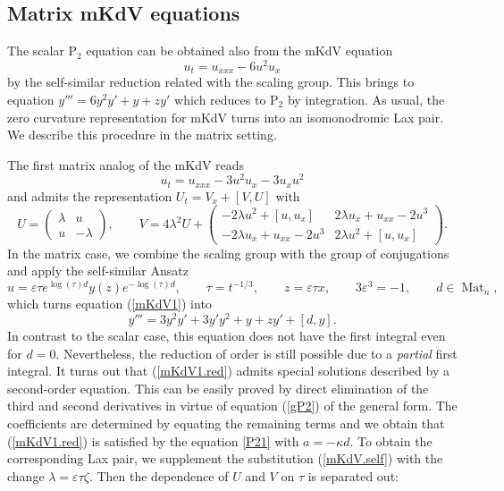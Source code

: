 \documentclass{article}
\theoremstyle{plain}
\theoremstyle{definition}
\DeclareMathOperator{\Mat}{Mat}
\begin{document}
\subsection{Matrix mKdV equations}

The scalar P$_2$ equation can be obtained also from the mKdV equation
\[
 u_t=u_{xxx}-6u^2u_x
\]
by the self-similar reduction related with the scaling group. This brings to equation $y'''=6y^2y'+y+zy'$ which reduces to P$_2$ by integration. As usual, the zero curvature representation for mKdV turns into an isomonodromic Lax pair. We describe this procedure in the matrix setting.

The first matrix analog of the mKdV \cite{Marchenko_1986} reads
\begin{equation}
\label{mKdV1}
 u_t= u_{xxx}-3u^2u_x-3u_xu^2
 \end{equation}
and admits the representation $U_t=V_x+[V,U]$ with
\[
 U=\begin{pmatrix}
  \lambda & u\\
  u & -\lambda
 \end{pmatrix},\qquad
 V=4\lambda^2U +
 \begin{pmatrix}
  -2\lambda u^2+[u,u_x] & 2\lambda u_x+u_{xx}-2u^3\\[1mm]
  -2\lambda u_x+u_{xx}-2u^3 & 2\lambda u^2+[u,u_x]
 \end{pmatrix}.
\]
In the matrix case, we combine the scaling group with the group of conjugations and apply the self-similar Ansatz
\begin{equation}\label{mKdV.self}
 u=\varepsilon\tau e^{\log(\tau)d}y(z)e^{-\log(\tau)d},\qquad 
 \tau=t^{-1/3},\qquad z=\varepsilon\tau x,\qquad 3\varepsilon^3=-1,\qquad d\in\Mat_n,
\end{equation}
which turns equation (\ref{mKdV1}) into
\begin{equation}\label{mKdV1.red}
 y'''=3y^2y'+3y'y^2+y+zy'+[d,y].
\end{equation}
In contrast to the scalar case, this equation does not have the first integral even for $d=0$. Nevertheless, the reduction of order is still possible due to a {\em partial} first integral. It turns out that (\ref{mKdV1.red}) admits special solutions described by a second-order equation. This can be easily proved by direct elimination of the third and second derivatives in virtue of equation (\ref{gP2}) of the general form. The coefficients are determined by equating the remaining terms and we obtain that (\ref{mKdV1.red}) is satisfied by the equation \ref{P21} with $a=-\kappa d$. To obtain the corresponding Lax pair, we supplement the substitution (\ref{mKdV.self}) with the change $\lambda=\varepsilon\tau\zeta$. Then the dependence of $U$ and $V$ on $\tau$ is separated out:
\end{document}
